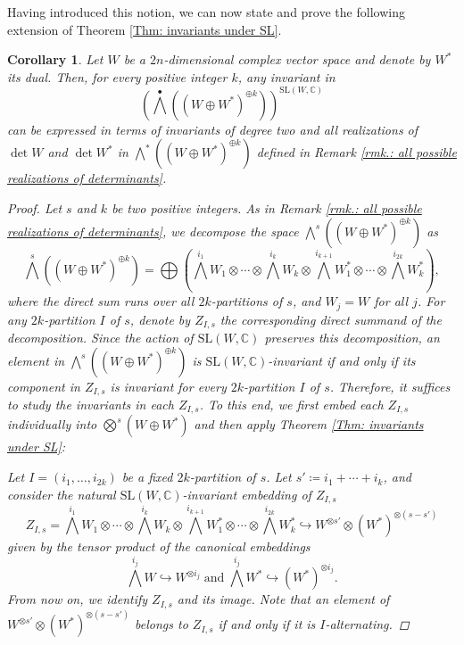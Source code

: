 \documentclass[11pt,twoside,a4paper]{amsart}
\newcommand{\0}{\mathscr{O}}
\newcommand{\C}{\mathbb{C}}
\theoremstyle{plain}
\newtheorem{cor}[thm]{Corollary}
\theoremstyle{definition}
\theoremstyle{remark}
\begin{document}
Having introduced this notion, we can now state and prove the following extension of Theorem \ref{Thm: invariants under SL}.

\begin{cor}
\label{Cor: invariants under SL extended version}
Let $W$ be a $2n$-dimensional complex vector space and denote by $W^*$ its dual. Then, for every positive integer $k$, any invariant in
\[
\textstyle\left(\bigwedge^{\bullet}((W\oplus W^*)^{\oplus k})\right)^{\mathrm{SL}(W,\C)}
\]
can be expressed in terms of invariants of degree two and all realizations of $\det W$ and $\det W^*$ in $\bigwedge^{*}\left((W\oplus W^*)^{\oplus k}\right)$ defined in Remark \ref{rmk.: all possible realizations of determinants}.
\begin{proof}
Let $s$ and $k$ be two positive integers. As in Remark \ref{rmk.: all possible realizations of determinants}, we decompose the space $\bigwedge^s\left((W\oplus W^*)^{\oplus k}\right)$ as
\[
\textstyle
\bigwedge^{s} \left( (W\oplus W^*)^{\oplus k} \right)=\bigoplus \left( \bigwedge^{i_1}W_1\otimes\cdots\otimes \bigwedge^{i_k}W_k\otimes \bigwedge^{i_{k+1}}W_1^*\otimes\cdots\otimes \bigwedge^{i_{2k}}W_k^*
\right),
\]
where the direct sum runs over all $2k$-partitions of $s$, and $W_j=W$ for all $j$. For any $2k$-partition $I$ of $s$, denote by $Z_{I,s}$ the corresponding direct summand of the decomposition.
Since the action of $\mathrm{SL}(W,\C)$ preserves this decomposition, an element in $\bigwedge^s\left((W\oplus W^*)^{\oplus k}\right)$ is $\mathrm{SL}(W,\C)$-invariant if and only if its component in $Z_{I,s}$ is invariant for every $2k$-partition $I$ of $s$. Therefore, it suffices to study the invariants in each $Z_{I,s}$.
To this end, we first embed each $Z_{I,s}$ individually into $\bigotimes^s(W\oplus W^*)$ and then apply Theorem \ref{Thm: invariants under SL}:

\smallskip

Let $I=(i_1,\ldots, i_{2k})$ be a fixed $2k$-partition of $s$. Let $s'\coloneqq i_1+\cdots+i_k$, and consider the natural $\mathrm{SL}(W,\C)$-invariant embedding of $ Z_{I,s}$
\begin{equation}
    \label{eq.: embedding of Z_I,s}
    \textstyle
Z_{I,s}=\bigwedge^{i_1}W_1\otimes\cdots\otimes \bigwedge^{i_k}W_k\otimes \bigwedge^{i_{k+1}}W_1^*\otimes\cdots\otimes \bigwedge^{i_{2k}}W_k^*\hookrightarrow W^{\otimes s'}\otimes(W^*)^{\otimes (s-s')}
\end{equation}
given by the tensor product of the canonical embeddings 
\[
\textstyle
\bigwedge^{i_j}W\hookrightarrow W^{\otimes i_j} \;\text{and}\; \bigwedge^{i_j}W^*\hookrightarrow (W^*)^{\otimes i_j}.
\]
From now on, we identify $Z_{I,s}$ and its image. Note that an element of $W^{\otimes s'}\otimes(W^*)^{\otimes (s-s')}$ belongs to $Z_{I,s}$ if and only if it is $I$-alternating.


\end{proof}
\end{cor}
\end{document}
